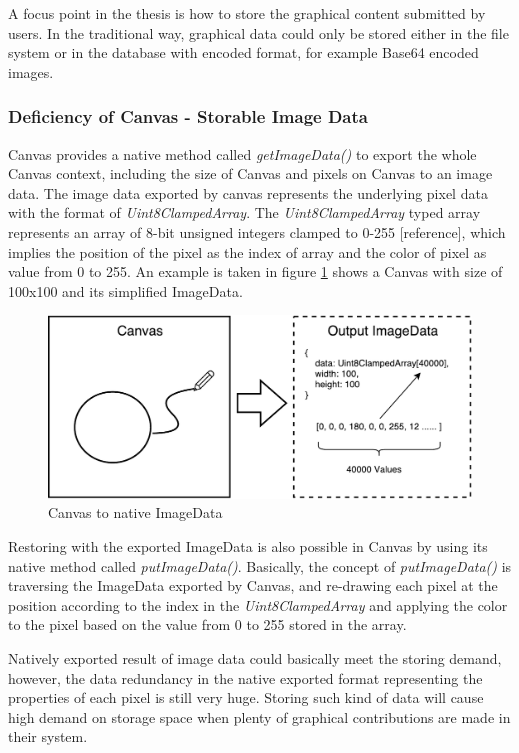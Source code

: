 A focus point in the thesis is how to store the graphical content submitted by users. In the traditional way, graphical data could only be stored either in the file system or in the database with encoded format, for example Base64 encoded images. 

\subsubsection{Deficiency of Canvas - Storable Image Data}
Canvas provides a native method called \textit{getImageData()} to export the whole Canvas context, including the size of Canvas and pixels on Canvas to an image data. The image data exported by canvas represents the underlying pixel data with the format of \textit{Uint8ClampedArray}. The \textit{Uint8ClampedArray} typed array represents an array of 8-bit unsigned integers clamped to 0-255 [reference], which implies the position of the pixel as the index of array and the color of pixel as value from 0 to 255. An example is taken in figure \ref{fig:canvas-imagedata} shows a Canvas with size of 100x100 and its simplified ImageData. 

\begin{figure}[!htbp]
  \centering
    \includegraphics[width=1\textwidth]{Figures/concept-canvas-imagedata.pdf}
  \caption{Canvas to native ImageData}
  \label{fig:canvas-imagedata}
\end{figure}

Restoring with the exported ImageData is also possible in Canvas by using its native method called \textit{putImageData()}. Basically, the concept of \textit{putImageData()} is traversing the ImageData exported by Canvas, and re-drawing each pixel at the position according to the index in the \textit{Uint8ClampedArray} and applying the color to the pixel based on the value from 0 to 255 stored in the array.

Natively exported result of image data could basically meet the storing demand, however, the data redundancy in the native exported format representing the properties of each pixel is still very huge. Storing such kind of data will cause high demand on storage space when plenty of graphical contributions are made in their system.

